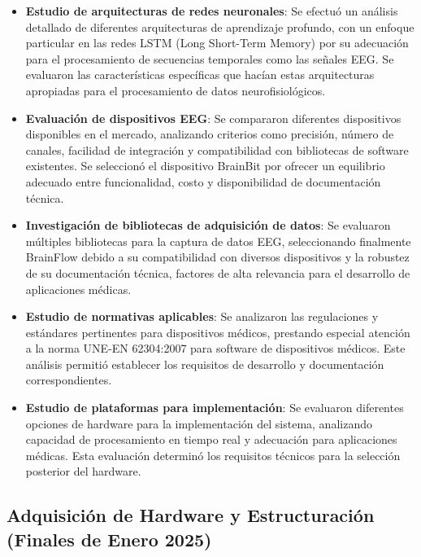 \begin{itemize}
    \item \textbf{Estudio de arquitecturas de redes neuronales}: Se efectuó un análisis detallado de diferentes arquitecturas de aprendizaje profundo, con un enfoque particular en las redes LSTM (Long Short-Term Memory) por su adecuación para el procesamiento de secuencias temporales como las señales EEG. Se evaluaron las características específicas que hacían estas arquitecturas apropiadas para el procesamiento de datos neurofisiológicos.
    
    \item \textbf{Evaluación de dispositivos EEG}: Se compararon diferentes dispositivos disponibles en el mercado, analizando criterios como precisión, número de canales, facilidad de integración y compatibilidad con bibliotecas de software existentes. Se seleccionó el dispositivo BrainBit por ofrecer un equilibrio adecuado entre funcionalidad, costo y disponibilidad de documentación técnica.
    
    \item \textbf{Investigación de bibliotecas de adquisición de datos}: Se evaluaron múltiples bibliotecas para la captura de datos EEG, seleccionando finalmente BrainFlow debido a su compatibilidad con diversos dispositivos y la robustez de su documentación técnica, factores de alta relevancia para el desarrollo de aplicaciones médicas.
    
    \item \textbf{Estudio de normativas aplicables}: Se analizaron las regulaciones y estándares pertinentes para dispositivos médicos, prestando especial atención a la norma UNE-EN 62304:2007 para software de dispositivos médicos. Este análisis permitió establecer los requisitos de desarrollo y documentación correspondientes.
    
    \item \textbf{Estudio de plataformas para implementación}: Se evaluaron diferentes opciones de hardware para la implementación del sistema, analizando capacidad de procesamiento en tiempo real y adecuación para aplicaciones médicas. Esta evaluación determinó los requisitos técnicos para la selección posterior del hardware.
\end{itemize}

\subsection{Adquisición de Hardware y Estructuración (Finales de Enero 2025)}

